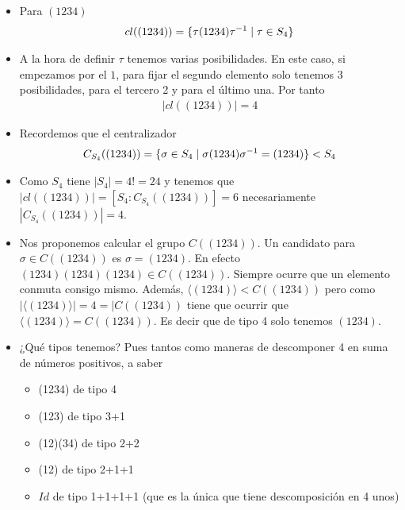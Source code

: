 \begin{ej}$ $ \newline
	\begin{itemize}
		\item Para $(1234)$
		\begin{align*}
		cl((1234)) = \{\tau(1234)\tau^{-1} \mid \tau \in S_4\}
		\end{align*}
		\item A la hora de definir $\tau$ tenemos varias posibilidades. En este caso, si empezamos por el $1$, para fijar el segundo elemento solo tenemos 3 posibilidades, para el tercero 2 y para el último una. Por tanto
		\begin{align*}
		|cl((1234))| = 4
		\end{align*}
		
		\item Recordemos que el centralizador
		\begin{align*}
		C_{S_4}((1234)) = \{\sigma \in S_4 \mid \sigma (1234) \sigma^{-1} = (1234)\} < S_4
		\end{align*}
		
		\item Como $S_4$ tiene $|S_4| = 4! = 24$ y tenemos que $|cl((1234))| = [S_4 : C_{S_4}((1234))] = 6$ necesariamente $|C_{S_4}((1234))| = 4$.
		
		\item Nos proponemos calcular el grupo $C((1234))$. Un candidato para $\sigma \in C((1234))$ es $\sigma = (1234)$. En efecto $(1234)(1234)(1234) \in C((1234))$. Siempre ocurre que un elemento conmuta consigo mismo. Además, $\langle (1234) \rangle < C((1234))$ pero como $|\langle (1234) \rangle| = 4 = |C((1234))$ tiene que ocurrir que $\langle (1234) \rangle = C((1234))$. Es decir que de tipo 4 solo tenemos $(1234)$.
		
		\item ¿Qué tipos tenemos? Pues tantos como maneras de descomponer 4 en suma de números positivos, a saber
		\begin{itemize}
			\item (1234) de tipo 4
			\item (123) de tipo 3+1
			\item (12)(34) de tipo 2+2
			\item (12) de tipo 2+1+1
			\item $Id$ de tipo 1+1+1+1 (que es la única que tiene descomposición en 4 unos)
		\end{itemize}
		

\end{itemize}
\end{ej}

